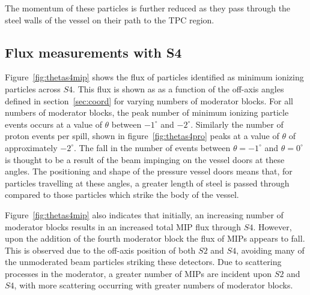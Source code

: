 The momentum of these particles is further reduced as they pass through the steel walls of the vessel on their path to the TPC region.

\subsection{Flux measurements with S4}

Figure~\ref{fig:thetas4mip} shows the flux of particles identified as minimum ionizing particles across $\mathit{S4}$.
This flux is shown as as a function of the off-axis angles defined in section~\ref{sec:coord} for varying numbers of moderator blocks.
For all numbers of moderator blocks, the peak number of minimum ionizing particle events occurs at a value of $\theta$ between $-1^{\circ}$ and $-2^{\circ}$.
Similarly the number of proton events per spill, shown in figure~\ref{fig:thetas4pro} peaks at a value of $\theta$ of approximately $-2^{\circ}$.
The fall in the number of events between $\theta = -1^{\circ}$ and $\theta = 0^{\circ}$ is thought to be a result of the beam impinging on the vessel doors at these angles.
The positioning and shape of the pressure vessel doors means that, for particles travelling at these angles, a greater length of steel is passed through compared to those particles which strike the body of the vessel.


Figure~\ref{fig:thetas4mip} also indicates that initially, an increasing number of moderator blocks results in an increased total MIP flux through $\mathit{S4}$. 
However, upon the addition of the fourth moderator block the flux of MIPs appears to fall.
This is observed due to the off-axis position of both $\mathit{S2}$ and $\mathit{S4}$, avoiding many of the unmoderated beam particles striking these detectors.
Due to scattering processes in the moderator, a greater number of MIPs are incident upon $\mathit{S2}$ and $\mathit{S4}$, with more scattering occurring with greater numbers of moderator blocks.

